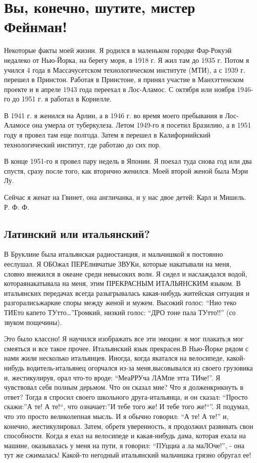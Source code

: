 \documentclass[11pt,]{article}
\begin{document}
\section{Вы, конечно, шутите, мистер Фейнман!}\label{----}

Некоторые факты моей жизни. Я родился в маленьком городке Фар-Рокуэй
недалеко от Нью-Йорка, на берегу моря, в 1918 г. Я жил там до 1935 г.
Потом я учился 4 года в Массачусетском технологическом институте (МТИ),
а с 1939 г. перешел в Принстон. Работая в Принстоне, я принял участие в
Манхэттенском проекте и в апреле 1943 года переехал в Лос-Аламос. С
октября или ноября 1946-го до 1951 г. я работал в Корнелле.

В 1941 г. я женился на Арлин, а в 1946 г. во время моего пребывания в
Лос-Аламосе она умерла от туберкулеза. Летом 1949-го я посетил Бразилию,
а в 1951 году я провел там еще полгода. Затем я перешел в Калифорнийский
технологический институт, где работаю до сих пор.

В конце 1951-го я провел пару недель в Японии. Я поехал туда снова год
или два спустя, сразу после того, как вторично женился. Моей второй
женой была Мэри Лу.

Сейчас я женат на Гвинет, она англичанка, и у нас двое детей: Карл и
Мишель. Р. Ф. Ф.

\subsection{Латинский или итальянский?}\label{--}

В Бруклине была итальянская радиостанция, и мальчишкой я постоянно
ееслушал. Я ОБОжал ПЕРЕливчатые ЗВУКи, которые накатывали на меня,
словно янежился в океане среди невысоких волн. Я сидел и наслаждался
водой, котораянакатывала на меня, этим ПРЕКРАСНЫМ ИТАЛЬЯНСКИМ языком. В
итальянских передачах всегда разыгрывалась какая-нибудь житейская
ситуация и разгоралисьжаркие споры между женой и мужем. Высокий голос:
``Нио теко ТИЕто капето ТУтто\ldots{}''Громкий, низкий голос: ``ДРО тоне
пала ТУтто!!'' (со звуком пощечины).

Это было классно! Я научился изображать все эти эмоции: я мог плакать;я
мог смеяться и все такое прочее. Итальянский язык прекрасен.В Нью-Йорке
рядом с нами жили несколько итальянцев. Иногда, когда якатался на
велосипеде, какой-нибудь водитель-итальянец огорчался из-за
меня,высовывался из своего грузовика и, жестикулируя, орал что-то вроде:
``МеаРРУча ЛАМпе этта ТИче!''. Я чувствовал себя полным дерьмом. Что он
сказал мне? Что я долженкрикнуть в ответ? Тогда я спросил своего
школьного друга-итальянца, и он сказал: ``Просто скажи:''А те! А те!``,
что означает:''И тебе того же! И тебе того же!``''. Я подумал, что это
просто великолепная мысль. И я обычно говорил: ``А те! А те!'' и,
конечно, жестикулировал. Затем, обретя уверенность, я продолжил
развивать свои способности. Когда я ехал на велосипеде и какая-нибудь
дама, которая ехала на машине, оказывалась у меня на пути, я говорил:
``ПУцциа а ла маЛОче!'', - она тут же сжималась! Какой-то негодный
итальянский мальчишка грязно обругал ее!
\end{document}
